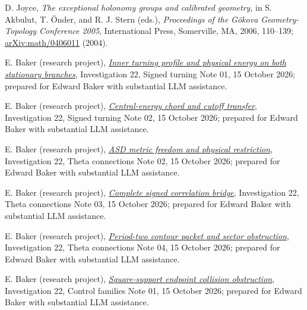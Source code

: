 \documentclass[11pt]{article}
\numberwithin{equation}{section}
\theoremstyle{definition}
\theoremstyle{remark}
\newcommand{\researchnote}[2]{\href{../../papers/investigations-2/active/22_theta_manifold_geometry/#1}{#2}}
\begin{document}
\begin{thebibliography}{99}
D. Joyce,
\emph{The exceptional holonomy groups and calibrated geometry},
in S. Akbulut, T. \"Onder, and R. J. Stern (eds.),
\emph{Proceedings of the G\"okova Geometry-Topology Conference 2005},
International Press, Somerville, MA, 2006, 110--139;
\href{https://arxiv.org/abs/math/0406011}{arXiv:math/0406011} (2004).

E. Baker (research project),
\researchnote{notes/02_signed_turning_control/01_INNER_TURNING_PROFILE_20261015.md}{\emph{Inner turning profile and physical energy on both stationary branches}},
Investigation 22, Signed turning Note 01, 15 October 2026;
prepared for Edward Baker with substantial LLM assistance.

E. Baker (research project),
\researchnote{notes/02_signed_turning_control/02_CENTRAL_ENERGY_CHORD_AND_CUTOFF_TRANSFER_20261015.md}{\emph{Central-energy chord and cutoff transfer}},
Investigation 22, Signed turning Note 02, 15 October 2026;
prepared for Edward Baker with substantial LLM assistance.

E. Baker (research project),
\researchnote{notes/03_theta_bundles_and_connections/02_ASD_METRIC_FREEDOM_AND_PHYSICAL_RESTRICTION_20261015.md}{\emph{ASD metric freedom and physical restriction}},
Investigation 22, Theta connections Note 02, 15 October 2026;
prepared for Edward Baker with substantial LLM assistance.

E. Baker (research project),
\researchnote{notes/03_theta_bundles_and_connections/03_COMPLETE_SIGNED_CORRELATION_BRIDGE_20261015.md}{\emph{Complete signed correlation bridge}},
Investigation 22, Theta connections Note 03, 15 October 2026;
prepared for Edward Baker with substantial LLM assistance.

E. Baker (research project),
\researchnote{notes/03_theta_bundles_and_connections/04_PERIOD_TWO_CONTOUR_PACKET_AND_SECTOR_OBSTRUCTION_20261015.md}{\emph{Period-two contour packet and sector obstruction}},
Investigation 22, Theta connections Note 04, 15 October 2026;
prepared for Edward Baker with substantial LLM assistance.

E. Baker (research project),
\researchnote{notes/05_control_families/01_SQUARE_SUPPORT_ENDPOINT_COLLISION_OBSTRUCTION_20261015.md}{\emph{Square-support endpoint collision obstruction}},
Investigation 22, Control families Note 01, 15 October 2026;
prepared for Edward Baker with substantial LLM assistance.


\end{thebibliography}
\end{document}
